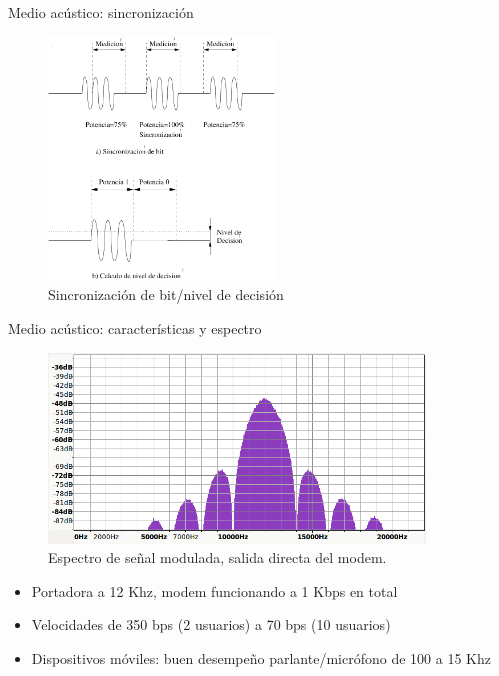 \documentclass[aspectratio=169]{beamer}
\begin{document}
\begin{frame}{Medio acústico: sincronización}

\begin{figure}[t]
  \centering  
    \includegraphics[width=6cm]{graphs/acusync}
    \\ Sincronización de bit/nivel de decisión
    \label{ios_process_mem}
\end{figure}

\end{frame}

\begin{frame}{Medio acústico: características y espectro}

\begin{figure}[t]
  \centering  
    \includegraphics[width=10cm]{graphs/spectrum.png}
    \\ Espectro de señal modulada, salida directa del modem.
    \label{ios_process_mem}
\end{figure}

\begin{itemize}
 \item Portadora a 12 Khz, modem funcionando a 1 Kbps en total
 \item Velocidades de 350 bps (2 usuarios) a 70 bps (10 usuarios)
 \item Dispositivos móviles: buen desempeño parlante/micrófono de 100 a 15 Khz
\end{itemize}

\end{frame}
\end{document}
